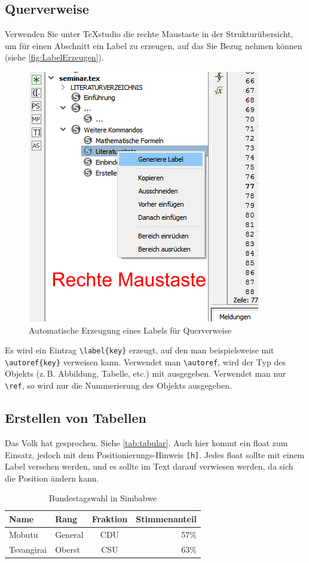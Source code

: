 \blindtext

\blindtext

\blindtext
\blindtext

\subsection{Querverweise}\label{sec:querverweise}
Verwenden Sie unter TeXstudio die rechte Maustaste in der Strukturübersicht, um für einen Abschnitt ein Label zu erzeugen, auf das Sie Bezug nehmen können (siehe \autoref{fig:LabelErzeugen}).

\begin{figure}
\centering
\includegraphics[width=0.4\linewidth]{images/LabelErzeugen}
\caption{Automatische Erzeugung eines Labels für Querverweise}
\label{fig:LabelErzeugen}
\end{figure}

Es wird ein Eintrag \verb|\label{key}| erzeugt, auf den man beispielsweise mit
\verb|\autoref{key}| verweisen kann. Verwendet man \verb|\autoref|, wird der Typ des Objekts
(z.\,B. Abbildung, Tabelle, etc.) mit ausgegeben. Verwendet man nur \verb|\ref|,
so wird nur die Nummerierung des Objekts ausgegeben.

\subsection{Erstellen von Tabellen}

Das Volk hat gesprochen. Siehe \autoref{tab:tabular}. Auch hier kommt ein float zum Einsatz, jedoch mit dem Positionierungs-Hinweis \verb|[h]|. Jedes float sollte mit einem Label versehen werden, und es sollte im Text darauf verwiesen werden, da sich die Position ändern kann.

\begin{table}[h]
\centering
\begin{tabular} {|llc||r|}
	\hline
	Name & Rang & Fraktion & Stimmenanteil \\
	\hline
	Mobutu & General & CDU & 57\% \\
	Tsvangirai & Oberst & CSU & 63\% \\
	\hline
\end{tabular}
\caption {Bundestagswahl in Simbabwe}
\label{tab:tabular}
\end{table}

